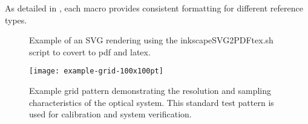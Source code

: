 As detailed in , each macro provides consistent formatting for different reference types.

\begin{figure}[p]
\centering
\def\svgwidth{0.8\columnwidth}

	\caption[Inkscape SVG]{Example of an SVG rendering using the inkscapeSVG2PDFtex.sh script to covert to pdf and latex.}
	\label{fig:InkscapeSVG}
\end{figure}

\begin{figure}[p]
	\centering
	\texttt{[image: example-grid-100x100pt]}
	\caption[Example grid pattern]{Example grid pattern demonstrating the resolution and sampling characteristics of the optical system. This standard test pattern is used for calibration and system verification.}
	\label{fig:example-grid}
\end{figure}







